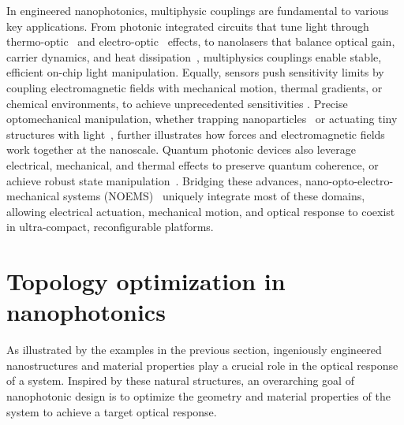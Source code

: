 In engineered nanophotonics, multiphysic couplings are fundamental to various key applications. From photonic integrated circuits that tune light through  
thermo-optic~\cite{TOPS_1, TOPS_2, TOPS_3, program, PIC} and electro-optic~\cite{modu, modu1, modu2, pockels} effects, to nanolasers that balance optical gain, carrier dynamics, and heat dissipation~\cite{laser,laser_pic}, multiphysics couplings enable stable, efficient on-chip light manipulation. Equally, sensors  
push sensitivity limits by coupling electromagnetic fields with mechanical motion, thermal gradients, or chemical environments, to achieve unprecedented sensitivities \cite{therm_sensing,sensing, weakforce}.
Precise optomechanical manipulation, wheth\-er trapping nanoparticles~\cite{ashkin_acceleration_1970} or actuating tiny structures with light~\cite{ivanyi_optically_2024}, further illustrates how forces and electromagnetic fields work together at the nanoscale. Quantum photonic devices 
also leverage electrical, mechanical, and thermal effects to preserve quantum coherence, or achieve robust state manipulation~\cite{quant_eo, Andrews_2014, Xi_2025}. Bridging these advances, nano-opto-electro-mechanical systems (NOEMS)~\cite{NOEMS} uniquely integrate most of these  
domains, allowing electrical actuation, mechanical motion, and optical response to coexist in ultra-compact, reconfigurable platforms. 



\section{Topology optimization in nanophotonics}\label{intro:to}

As illustrated by the examples in the previous section, ingeniously engineered nanostructures and material properties play a crucial role in the
optical response of a system. Inspired by these natural structures, an overarching goal of nanophotonic
design is to optimize the geometry and material properties of the system to achieve a target
optical response.

